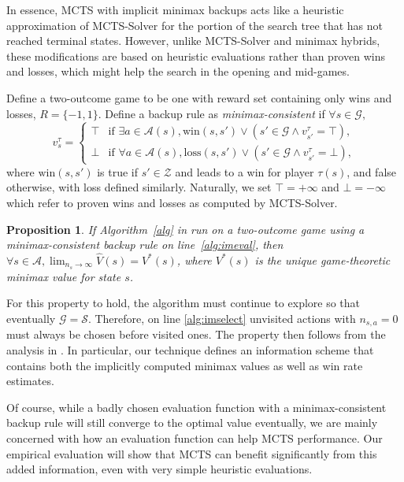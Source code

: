 \documentclass[letterpaper]{article}
\newcommand{\cA}{\mathcal{A}}
\newcommand{\cG}{\mathcal{G}}
\newcommand{\cS}{\mathcal{S}}
\newcommand{\cZ}{\mathcal{Z}}
\newcommand{\hV}{\hat{V}}
\newtheorem{proposition}{Proposition}
\begin{document}
In essence, MCTS with implicit minimax backups acts like a heuristic approximation of MCTS-Solver for the portion of the
search tree that has not reached terminal states. 
However, unlike MCTS-Solver and minimax hybrids, these modifications are based on heuristic evaluations rather than 
proven wins and losses, which might help the search in the opening and mid-games. 

Define a two-outcome game to be one with reward set containing only wins and losses, $R = \{ -1, 1 \}$. 
Define a backup rule as {\it minimax-consistent} if $\forall s \in \cG,$
\[ 
v^{\tau}_s = \left\{ \begin{array}{ll}
\top & \mbox{if } \exists a \in \cA(s), \mbox{win}(s, s') \vee (s' \in \cG \wedge v^{\tau}_{s'} = \top), \\
\bot & \mbox{if } \forall a \in \cA(s), \mbox{loss}(s, s') \vee (s' \in \cG \wedge v^{\tau}_{s'} = \bot), \end{array} \right. 
\]
where $\mbox{win}(s,s')$ is true if $s' \in \cZ$ and leads to a win for player $\tau(s)$, and false otherwise, 
with loss defined similarly.
  Naturally, we set $\top = +\infty$ and $\bot = -\infty$ which refer to proven wins and losses as computed by MCTS-Solver. 

\begin{proposition}
If Algorithm~\ref{alg} in run on a two-outcome game using a minimax-consistent
backup rule on line~\ref{alg:imeval}, then
$\forall s \in \cA, \lim_{n_s \rightarrow \infty} \hV(s) = V^*(s)$, where $V^*(s)$ is the 
unique game-theoretic minimax value for state $s$.  
\end{proposition}

For this property to hold, the algorithm must continue to explore so that eventually $\cG = \cS$. Therefore,
on line \ref{alg:imselect} unvisited actions with $n_{s,a} = 0$ must always be chosen before visited ones. 
The property then follows from the analysis in \cite[Section 2.3]{Saffidine13PhdThesis}. 
In particular, our technique defines an information scheme that contains both the implicitly computed 
minimax values as well as win rate estimates. 

Of course, while a badly chosen evaluation function with a minimax-consistent backup rule will still converge to the 
optimal value eventually, we are mainly concerned with how an evaluation function can help MCTS performance.
Our empirical evaluation will show that MCTS can benefit significantly from this added information, even with 
very simple heuristic evaluations.
\end{document}
